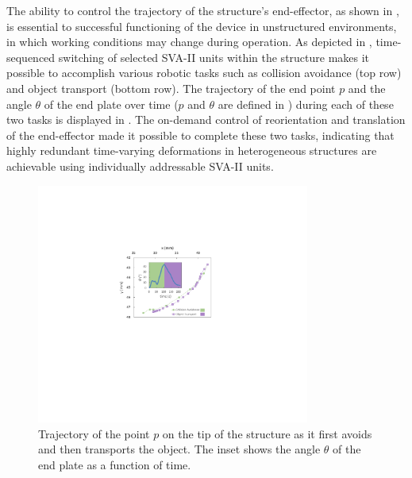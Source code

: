 The ability to control the trajectory of the structure's end-effector, as shown in , is essential to successful functioning of the device in unstructured environments, in which working conditions may change during operation. As depicted in , time-sequenced switching of selected SVA-II units within the structure makes it possible to accomplish various robotic tasks such as collision avoidance (top row) and object transport (bottom row). The trajectory of the end point $p$ and the angle $\theta$ of the end plate over time ($p$ and $\theta$ are defined in ) during each of these two tasks is displayed  in . The on-demand control of reorientation and translation of the end-effector made it possible to complete these two tasks, indicating that highly redundant time-varying deformations in heterogeneous structures are achievable using individually addressable SVA-II units.
\begin{figure}[!ht]
\centering
\includegraphics[width=0.8\textwidth]{unstructuredTraj.pdf}
\caption[On-demand creation of trajectories in unstructured environments]{Trajectory of the point $p$ on the tip of the structure as it first avoids and then transports the object. The inset shows the angle $\theta$ of the end plate as a function of time.}
\label{fig:unstructuredTraj}
\end{figure}


